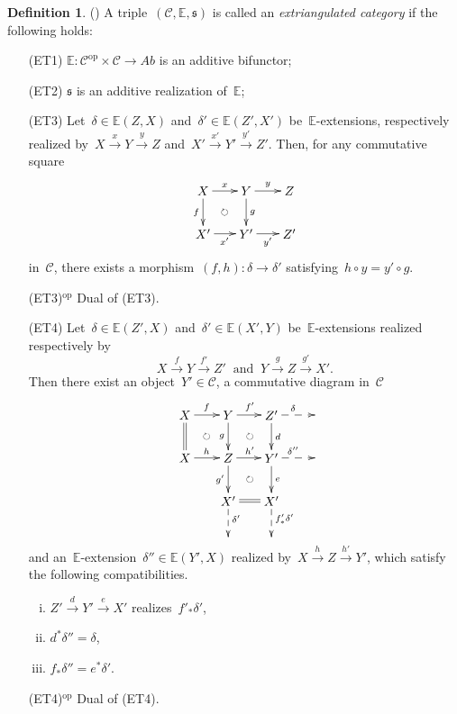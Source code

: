 \documentclass{amsart}
\theoremstyle{definition}
\newtheorem{definition}[theorem]{Definition}
\newcommand{\darkblue}{\color{darkblue}} %
\newcommand{\defn}[1]{\textsl{\darkblue #1}} %
\newcommand{\cat}{\mathcal{C}}
\begin{document}
\begin{definition}(\cite[Definition 2.12]{NakaokaPalu})
A triple~$(\cat,\mathbb{E},\mathfrak{s})$ is called an \defn{extriangulated category} if the following holds:
\begin{itemize}
\item[{\rm (ET1)}] $\mathbb{E}:\cat^{\mathrm{op}}\times\cat\to\mathit{Ab}$ is an additive bifunctor;
\item[{\rm (ET2)}] $\mathfrak{s}$ is an additive realization of~$\mathbb{E}$;
\item[{\rm (ET3)}] Let~$\delta\in\mathbb{E}(Z,X)$ and~$\delta'\in\mathbb{E}(Z',X')$ be~$\mathbb{E}$-extensions, respectively realized by~$X\xrightarrow{x}Y\xrightarrow{y}Z$ and~$X'\xrightarrow{x'}Y'\xrightarrow{y'}Z'$. Then, for any commutative square
\[
\xy
(-12,6)*+{X}="0";
(0,6)*+{Y}="2";
(12,6)*+{Z}="4";
%
(-12,-6)*+{X'}="10";
(0,-6)*+{Y'}="12";
(12,-6)*+{Z'}="14";
%
{\ar^{x} "0";"2"};
{\ar^{y} "2";"4"};
%
{\ar_{f} "0";"10"};
{\ar^{g} "2";"12"};
%
{\ar_{x'} "10";"12"};
{\ar_{y'} "12";"14"};
%
{\ar@{}|{} "0";"12"};
%
{\ar@{}|\circlearrowright "0";"12"};
\endxy 
\]
in~$\cat$, there exists a morphism~$(f,h):\delta\to\delta'$ satisfying~$h\circ y=y'\circ g$.
\item[{\rm (ET3)$^{\mathrm{op}}$}] Dual of {\rm (ET3)}.
\item[{\rm (ET4)}] Let~$\delta\in\mathbb{E}(Z',X)$ and~$\delta'\in\mathbb{E}(X',Y)$ be~$\mathbb{E}$-extensions realized respectively by
\[
X\overset{f}{\longrightarrow}Y\overset{f'}{\longrightarrow}Z'\ \text{ and } \ Y\overset{g}{\longrightarrow}Z\overset{g'}{\longrightarrow}X'.
\]
Then there exist an object~$Y'\in\cat$, a commutative diagram in~$\cat$
\[
\xy
(-18,6)*+{X}="0";
(-6,6)*+{Y}="2";
(6,6)*+{Z'}="4";
(18,6)="6";
%
(-18,-6)*+{X}="10";
(-6,-6)*+{Z}="12";
(6,-6)*+{Y'}="14";
(18,-6)="16";
%
(-6,-18)*+{X'}="22";
(6,-18)*+{X'}="24";
%
(-6,-28)="32";
(6,-28)="34";
%
%
{\ar^{f} "0";"2"};
{\ar^{f'} "2";"4"};
%
{\ar@{=} "0";"10"};
{\ar_{g} "2";"12"};
{\ar^{d} "4";"14"};
%
{\ar^{h} "10";"12"};
{\ar^{h'} "12";"14"};
%
{\ar_{g'} "12";"22"};
{\ar^{e} "14";"24"};
%
{\ar@{=} "22";"24"};
%
{\ar@{}|{} "0";"12"};
{\ar@{}|{} "2";"14"};
{\ar@{}|{} "12";"24"};
%
{\ar@{-->}^\delta "4";"6"};
{\ar@{-->}^{\delta''} "14";"16"};
{\ar@{-->}^{\delta'} "22";"32"};
{\ar@{-->}^{f'_\ast \delta'} "24";"34"};
%
{\ar@{}|\circlearrowright "0";"12"};
{\ar@{}|\circlearrowright "2";"14"};
{\ar@{}|\circlearrowright "12";"24"};
\endxy
\]
and an~$\mathbb{E}$-extension~$\delta''\in\mathbb{E}(Y',X)$ realized by~$X\overset{h}{\longrightarrow}Z\overset{h'}{\longrightarrow}Y'$, which satisfy the following compatibilities.
  \begin{enumerate}[(i)]
    \item $Z'\overset{d}{\longrightarrow}Y'\overset{e}{\longrightarrow}X'$ realizes~$f'_\ast\delta'$,
    \item $d^\ast\delta''=\delta$,
    \item $f_\ast\delta''=e^\ast\delta'$. 
  \end{enumerate}
\item[{\rm (ET4)$^{\mathrm{op}}$}] Dual of {\rm (ET4)}.
\end{itemize}
\end{definition}
\end{document}
